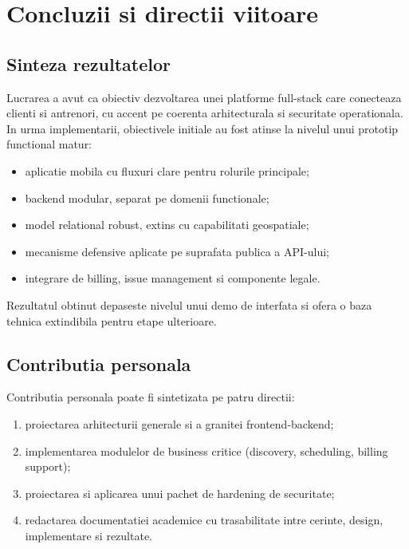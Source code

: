 \chapter{Concluzii si directii viitoare}

\section{Sinteza rezultatelor}

Lucrarea a avut ca obiectiv dezvoltarea unei platforme full-stack care conecteaza clienti si antrenori, cu accent pe coerenta arhitecturala si securitate operationala. In urma implementarii, obiectivele initiale au fost atinse la nivelul unui prototip functional matur:
\begin{itemize}[leftmargin=1.2cm]
    \item aplicatie mobila cu fluxuri clare pentru rolurile principale;
    \item backend modular, separat pe domenii functionale;
    \item model relational robust, extins cu capabilitati geospatiale;
    \item mecanisme defensive aplicate pe suprafata publica a API-ului;
    \item integrare de billing, issue management si componente legale.
\end{itemize}

Rezultatul obtinut depaseste nivelul unui demo de interfata si ofera o baza tehnica extindibila pentru etape ulterioare.

\section{Contributia personala}

Contributia personala poate fi sintetizata pe patru directii:
\begin{enumerate}[leftmargin=1.2cm]
    \item proiectarea arhitecturii generale si a granitei frontend-backend;
    \item implementarea modulelor de business critice (discovery, scheduling, billing support);
    \item proiectarea si aplicarea unui pachet de hardening de securitate;
    \item redactarea documentatiei academice cu trasabilitate intre cerinte, design, implementare si rezultate.
\end{enumerate}

